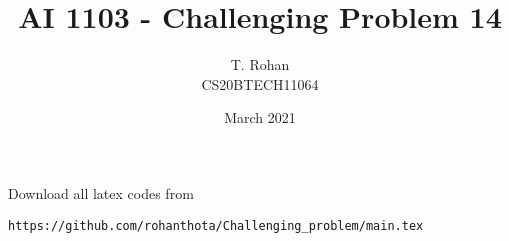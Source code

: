 \documentclass[journal,12pt,twocolumn]{IEEEtran}
\date{March 2021}
\DeclareMathOperator*{\Res}{Res}
\begin{document}
\newcommand{\BEQA}{\begin{eqnarray}}
\newcommand{\EEQA}{\end{eqnarray}}
\newcommand{\define}{\stackrel{\triangle}{=}}

\raggedbottom
\setlength{\parindent}{0pt}
\providecommand{\mbf}{\mathbf}
\providecommand{\pr}[1]{\ensuremath{\Pr\left(#1\right)}}
\providecommand{\qfunc}[1]{\ensuremath{Q\left(#1\right)}}
\providecommand{\fn}[1]{\ensuremath{f\left(#1\right)}}
\providecommand{\e}[1]{\ensuremath{E\left(#1\right)}}
\providecommand{\sbrak}[1]{\ensuremath{{}\left[#1\right]}}
\providecommand{\lsbrak}[1]{\ensuremath{{}\left[#1\right.}}
\providecommand{\rsbrak}[1]{\ensuremath{{}\left.#1\right]}}
\providecommand{\brak}[1]{\ensuremath{\left(#1\right)}}
\providecommand{\lbrak}[1]{\ensuremath{\left(#1\right.}}
\providecommand{\rbrak}[1]{\ensuremath{\left.#1\right)}}
\providecommand{\cbrak}[1]{\ensuremath{\left\{#1\right\}}}
\providecommand{\lcbrak}[1]{\ensuremath{\left\{#1\right.}}
\providecommand{\rcbrak}[1]{\ensuremath{\left.#1\right\}}}
\theoremstyle{remark}
\newtheorem{rem}{Remark}
\newcommand{\sgn}{\mathop{\mathrm{sgn}}}
\providecommand{\abs}[1]{\vert#1\vert}
\providecommand{\res}[1]{\Res\displaylimits_{#1}} 
\providecommand{\norm}[1]{\lVert#1\rVert}
\providecommand{\mtx}[1]{\mathbf{#1}}
\providecommand{\mean}[1]{E[ #1 ]}
\providecommand{\fourier}{\overset{\mathcal{F}}{ \rightleftharpoons}}
\providecommand{\system}{\overset{\mathcal{H}}{ \longleftrightarrow}}
\newcommand{\solution}{\noindent \textbf{Solution: }}
\newcommand{\cosec}{\,\text{cosec}\,}
\providecommand{\dec}[2]{\ensuremath{\overset{#1}{\underset{#2}{\gtrless}}}}
\newcommand{\myvec}[1]{\ensuremath{\begin{pmatrix}#1\end{pmatrix}}}
\newcommand{\mydet}[1]{\ensuremath{\begin{vmatrix}#1\end{vmatrix}}}
\makeatletter
{}
\makeatother
\let\StandardTheFigure\thefigure
\let\vec\mathbf
\renewcommand{\thefigure}{\theproblem}
\def\putbox#1#2#3{\makebox[0in][l]{\makebox[#1][l]{}\raisebox{\baselineskip}[0in][0in]{\raisebox{#2}[0in][0in]{#3}}}}
     \def\rightbox#1{\makebox[0in][r]{#1}}
     \def\centbox#1{\makebox[0in]{#1}}
     \def\topbox#1{\raisebox{-\baselineskip}[0in][0in]{#1}}
     \def\midbox#1{\raisebox{-0.5\baselineskip}[0in][0in]{#1}}
\vspace{3cm}
\title{AI 1103 - Challenging Problem 14}
\author{T. Rohan \\ CS20BTECH11064}
\maketitle
\newpage
\bigskip
\renewcommand{\thefigure}{\theenumi}
\renewcommand{\thetable}{\theenumi}
Download all latex codes from 
\begin{lstlisting}
https://github.com/rohanthota/Challenging_problem/main.tex
\end{lstlisting}
\end{document}
